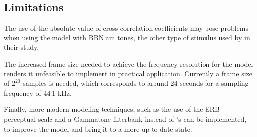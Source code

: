 \documentclass[../main.tex]{subfiles}
\begin{document}
\subsection{Limitations}

The use of the absolute value of cross correlation coefficients may pose
problems when using the model with \gls{BBN} \gls{am} tones, the other type
of stimulus used by \citeauthor{Fastl2007Psychoacoustics} in their study.

The increased frame size needed to achieve the frequency resolution for the
model renders it unfeasible to implement in practical application. Currently
a frame size of $2^20$ samples is needed, which corresponds to around 24 seconds
for a sampling frequency of 44.1 kHz.

Finally, more modern modeling techniques, such as the use of the ERB perceptual
scale and a Gammatone filterbank instead of \citeauthor{Terhardt1979}'s can be
implemented, to improve the model and bring it to a more up to date state.
\end{document}

